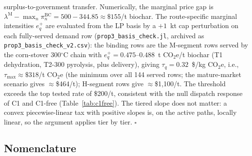 surplus-to-government transfer. Numerically, the marginal price gap is
$\lambda^{\mathrm{M}}-\max_n\pi^{\mathrm{BC}}_n =
500-344.85\approx\$155$/t biochar. The route-specific marginal intensities
$e^{+}_q$ are evaluated from the LP basis by a $+1$~kt cap perturbation on each
fully-served demand row (\texttt{prop3\_basis\_check.jl}, archived as
\texttt{prop3\_basis\_check\_v2.csv}): the binding rows are the M-segment rows
served by the corn-stover 300$^\circ$C chain with
$e^{+}_q=0.475$--$0.488$~t CO$_2$e/t biochar (T1 dehydration, T2-300
pyrolysis, plus delivery), giving $\tau_q=0.32$~\$/kg CO$_2$e, i.e.,
$\tau_{\max}\approx\$318$/t CO$_2$e (the minimum over all 144 served rows;
the mature-market scenario gives $\approx$\$464/t); H-segment rows give
$\approx$\$1{,}100/t. The threshold exceeds the top tested rate of
\$200/t, consistent with the null dispatch response of C1 and
C1-free (Table~\ref{tab:c1free}). The tiered slope does not matter: a
convex piecewise-linear tax with positive slopes is, on the active paths,
locally linear, so the argument applies tier by tier.
$\square$

\subsection{Nomenclature}

